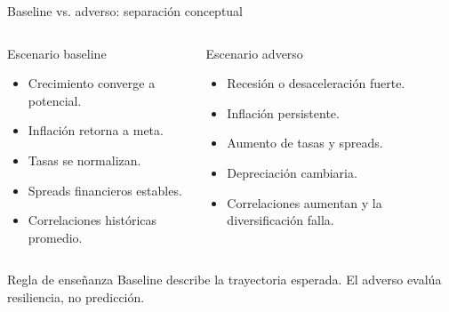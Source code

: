 \documentclass[aspectratio=169,11pt]{beamer}
\begin{document}
\begin{frame}{Baseline vs. adverso: separación conceptual}
\begin{columns}[T]
\begin{block}{Escenario baseline}
\begin{itemize}
  \item Crecimiento converge a potencial.
  \item Inflación retorna a meta.
  \item Tasas se normalizan.
  \item Spreads financieros estables.
  \item Correlaciones históricas promedio.
\end{itemize}
\end{block}

\begin{alertblock}{Escenario adverso}
\begin{itemize}
  \item Recesión o desaceleración fuerte.
  \item Inflación persistente.
  \item Aumento de tasas y spreads.
  \item Depreciación cambiaria.
  \item Correlaciones aumentan y la diversificación falla.
\end{itemize}
\end{alertblock}
\end{columns}

\vspace{0.3cm}
\begin{block}{Regla de enseñanza}
Baseline describe la trayectoria esperada. El adverso evalúa resiliencia, no predicción.
\end{block}
\end{frame}
\end{document}
